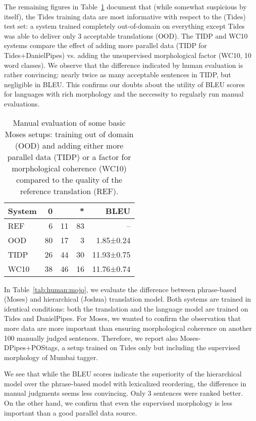 \documentclass[11pt]{article}
\def\Tref#1{Table~\ref{#1}}
\begin{document}
The remaining figures in \Tref{tab:human} document that (while somewhat
suspicious by itself), the Tides training data are most informative with respect
to the (Tides) test set: a system trained completely out-of-domain on everything
except Tides was able to deliver only 3 acceptable translations (OOD). The TIDP
and WC10 systems compare the effect of adding more parallel data (TIDP for
Tides+DanielPipes) vs. adding the unsupervised morphological factor (WC10, 10
word classes). We observe that the difference indicated by human evaluation is
rather convincing: nearly twice as many acceptable sentences in TIDP, but
negligible in BLEU. This confirms our doubts about the utility of BLEU scores
for languages with rich morphology and the neccessity to regularly run manual
evaluations.


\begin{table}[ht]
\begin{centering}
\begin{tabular}{l|r|r|r|r}
{\bf System} & {\bf 0} & {\bf*} & {\bf**} & {\bf BLEU}\\
\hline
REF  &  6    &  11  &   83   &  -- \\
OOD &   80  &   17   &  3   &   1.85±0.24\\
TIDP &  26  &   44   &  30   &  11.93±0.75\\
WC10 &  38   &  46   &  16   &  11.76±0.74\\
\end{tabular}
\caption{Manual evaluation of some basic Moses setups: training out of domain
(OOD) and adding either more parallel data (TIDP) or a factor for morphological
coherence (WC10) compared to the quality of the reference translation (REF).
}
\label{tab:human}
\end{centering}
\end{table}

In \Tref{tab:human:mojo}, we evaluate the difference between phrase-based
(Moses) and hierarchical (Joshua) translation model. Both systems are trained in
identical conditions: both the translation and the language model are trained on
Tides and DanielPipes. For Moses, we wanted to confirm the observation that more
data are more important than ensuring morphological coherence on another 100
manually judged sentences. Therefore, we report also Moses-DPipes+POStags, a
setup trained on Tides only but including the supervised morphology of Mumbai
tagger.

We see that while the BLEU scores indicate the superiority of the hierarchical
model over the phrase-based model with lexicalized reordering, the difference in
manual judgments seems less convincing. Only 3
sentences were ranked better. On the other hand, we confirm that even the
supervised morphology is less important than a good parallel data source.
\end{document}
